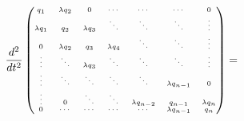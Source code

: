 \documentclass[11pt,letterpaper,twocolumn]{article}
\begin{document}
$${\fontsize{6}{6}\selectfont
\frac { { d }^{ 2 } }{ d{ t }^{ 2 } } \begin{pmatrix} { q }_{ 1 } & \lambda { q }_{ 2 } & 0 & \cdots  & \cdots  & \cdots  & 0 \\ \lambda { q }_{ 1 } & { q }_{ 2 } & \lambda { q }_{ 3 } & \ddots  & \ddots  & \ddots  & \vdots  \\ 0 & \lambda { q }_{ 2 } & { q }_{ 3 } & \lambda { q }_{ 4 } & \ddots  & \ddots  & \vdots  \\ \vdots  & \ddots  & \lambda { q }_{ 3 } & \ddots  & \ddots  & \ddots  & \vdots  \\ \vdots  & \ddots  & \ddots  & \ddots  & \ddots  & \lambda { q }_{ n-1 } & 0 \\ \vdots  & 0 & \ddots  & \ddots  & \lambda { q }_{ n-2 } & { q }_{ n-1 } & \lambda { q }_{ n } \\ 0 & \cdots  & \cdots  & \cdots  & \cdots  & \lambda { q }_{ n-1 } & { q }_{ n } \end{pmatrix}}=$$
\end{document}
